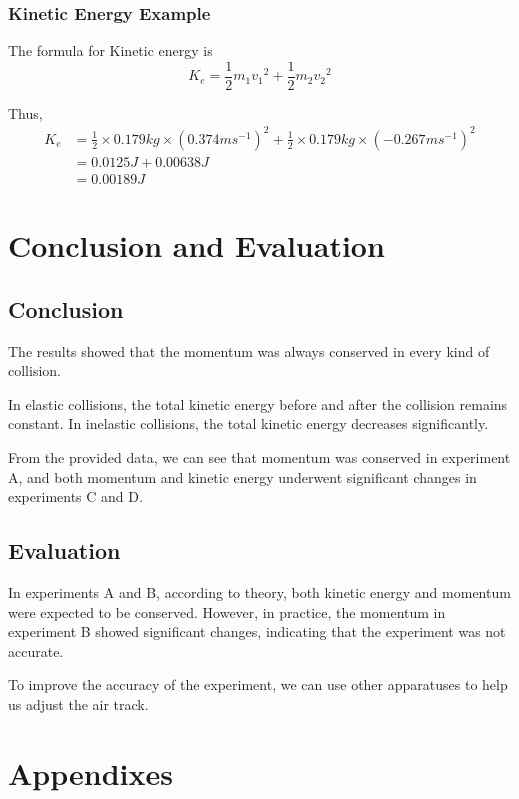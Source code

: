 \documentclass[12pt,a4paper]{article}
\begin{document}
\begin{spacing}{1.25}
\subsubsection{Kinetic Energy Example}
The formula for Kinetic energy is \[
    K_e = \frac{1}{2}m_1{v_1}^2 + \frac{1}{2}m_2{v_2}^2
\]\par
Thus,\[
    \begin{aligned}
        K_e & = \frac{1}{2} \times 0.179 kg \times (0.374 ms^{-1})^2 + \frac{1}{2} \times 0.179kg \times (-0.267ms^{-1})^2 \\ 
        & = 0.0125J + 0.00638J \\ 
        & = 0.00189J
    \end{aligned}
\]
\section{Conclusion and Evaluation}
\subsection{Conclusion}
The results showed that the momentum was always conserved in every kind of collision. \par
In elastic collisions, the total kinetic energy before and after the collision remains constant. In inelastic collisions, the total kinetic energy decreases significantly.\par
From the provided data, we can see that momentum was conserved in experiment A, and both momentum and kinetic energy underwent significant changes in experiments C and D.
\subsection{Evaluation}
In experiments A and B, according to theory, both kinetic energy and momentum were expected to be conserved. However, in practice, the momentum in experiment B showed significant changes, indicating that the experiment was not accurate. \par
To improve the accuracy of the experiment, we can use other apparatuses to help us adjust the air track.
\section{Appendixes}

\end{spacing}
\end{document}
